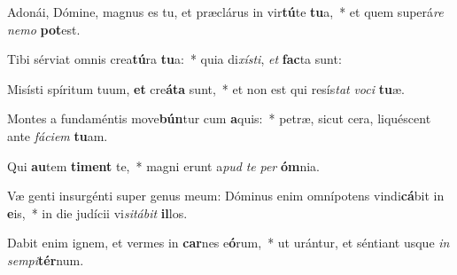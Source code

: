 \item Adonái, Dómine, magnus es tu, et præclárus in vir\textbf{tú}te \textbf{tu}a,~* et quem superá\textit{re} \textit{ne}\textit{mo} \textbf{pot}est.
\item Tibi sérviat omnis crea\textbf{tú}ra \textbf{tu}a:~* quia di\textit{xís}\textit{ti}, \textit{et} \textbf{fac}ta sunt:
\item Misísti spíritum tuum, \textbf{et} cre\textbf{á}\textbf{ta} sunt,~* et non est qui resís\textit{tat} \textit{vo}\textit{ci} \textbf{tu}æ.
\item Montes a fundaméntis move\textbf{bún}tur cum \textbf{a}quis:~* petræ, sicut cera, liquéscent ante \textit{fá}\textit{ci}\textit{em} \textbf{tu}am.
\item Qui \textbf{au}tem \textbf{ti}\textbf{ment} te,~* magni erunt a\textit{pud} \textit{te} \textit{per} \textbf{óm}nia.
\item Væ genti insurgénti super genus meum: Dóminus enim omnípotens vindi\textbf{cá}bit in \textbf{e}is,~* in die judícii vi\textit{si}\textit{tá}\textit{bit} \textbf{il}los.
\item Dabit enim ignem, et vermes in \textbf{car}nes e\textbf{ó}rum,~* ut urántur, et séntiant usque \textit{in} \textit{sem}\textit{pi}\textbf{tér}num.
